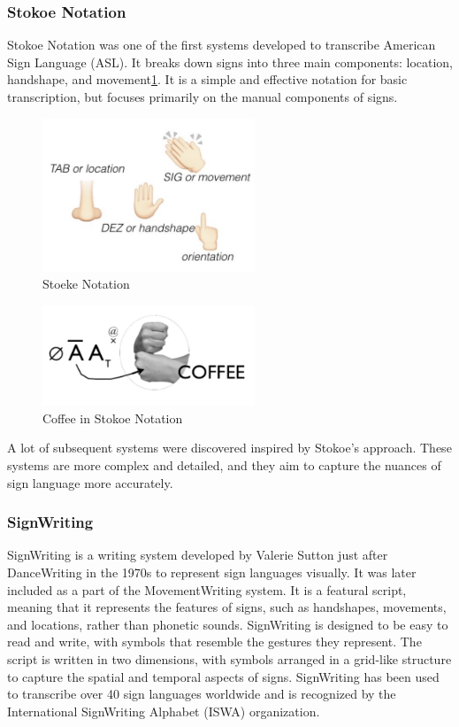 \documentclass[../../main.tex]{subfiles}
\begin{document}
\subsubsection{Stokoe Notation}

Stokoe Notation\cite{stokoe1980sign} was one of the first systems developed to transcribe American Sign Language (ASL). It breaks down signs into three main components: location, handshape, and movement\ref{fig:stoeke}. It is a simple and effective notation for basic transcription, but focuses primarily on the manual components of signs.

\begin{figure}
  \centering \includegraphics[width = 2.5in]{chapters/background_work/images/stokoe.png}
  \caption{Stoeke Notation}
  \label{fig:stoeke}
\end{figure}

\begin{figure}
  \centering \includegraphics[width = 2.5in]{chapters/background_work/images/stokoe_coffee.png}
  \caption{Coffee in Stokoe Notation}
  \label{fig:stoeke_coffee}
\end{figure}

A lot of subsequent systems were discovered inspired by Stokoe's approach. These systems are more complex and detailed, and they aim to capture the nuances of sign language more accurately.

\subsubsection{SignWriting}

SignWriting is a writing system developed by Valerie Sutton just after DanceWriting\cite{sutton1973sutton} in the 1970s to represent sign languages visually. It was later included as a part of the MovementWriting system. It is a featural script, meaning that it represents the features of signs, such as handshapes, movements, and locations, rather than phonetic sounds. SignWriting is designed to be easy to read and write, with symbols that resemble the gestures they represent. The script is written in two dimensions, with symbols arranged in a grid-like structure to capture the spatial and temporal aspects of signs. SignWriting has been used to transcribe over 40 sign languages worldwide and is recognized by the International SignWriting Alphabet (ISWA) organization.
\end{document}
